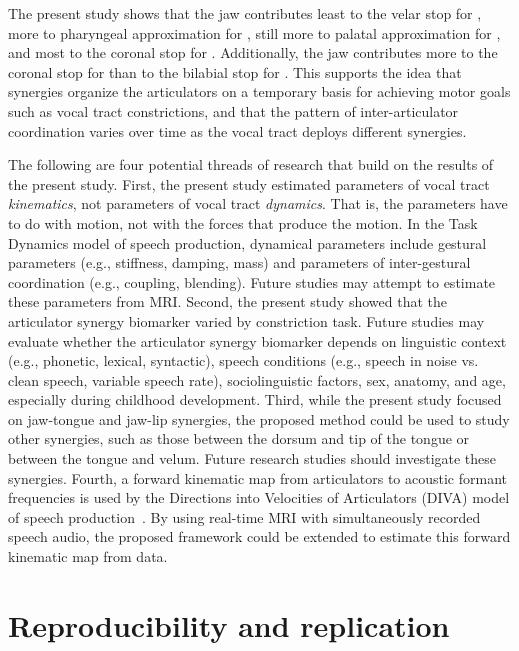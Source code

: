 \documentclass[preprint]{JASAnew}\usepackage[]{graphicx}\usepackage[]{color}
\begin{document}
The present study shows that the jaw contributes 
least to the velar stop for \textipa{[k]},
more to pharyngeal approximation for \textipa{[A]}, 
still more to palatal approximation for \textipa{[i]},
and most to the coronal stop for \textipa{[t]}.
Additionally, the jaw contributes more to the coronal stop for \textipa{[t]} than to the bilabial stop for \textipa{[p]}.
%
This supports the idea that synergies organize the articulators on a temporary basis for achieving motor goals such as vocal tract constrictions, and that the pattern of inter-articulator coordination varies over time as the vocal tract deploys different synergies. 




The following are four potential threads of research that build on the results of the present study.
%
First, the present study estimated parameters of vocal tract \textit{kinematics}, not parameters of vocal tract \textit{dynamics}. That is, the parameters have to do with motion, not with the forces that produce the motion. In the Task Dynamics model of speech production, dynamical parameters include gestural parameters (e.g., stiffness, damping, mass) and parameters of inter-gestural coordination (e.g., coupling, blending). Future studies may attempt to estimate these parameters from MRI.
%
Second, the present study showed that the articulator synergy biomarker varied by constriction task. Future studies may evaluate whether the articulator synergy biomarker depends on linguistic context (e.g., phonetic, lexical, syntactic), speech conditions (e.g., speech in noise vs. clean speech, variable speech rate), sociolinguistic factors, sex, anatomy, and age, especially during childhood development.
%
Third, while the present study focused on jaw-tongue and jaw-lip synergies, the proposed method could be used to study other synergies, such as those between the dorsum and tip of the tongue or between the tongue and velum. Future research studies should investigate these synergies.
%
Fourth, a forward kinematic map from articulators to acoustic formant frequencies is used by the Directions into Velocities of Articulators (DIVA) model of speech production~\cite{guenther1995speech}. By using real-time MRI with simultaneously recorded speech audio, the proposed framework could be extended to estimate this forward kinematic map from data.




\section{Reproducibility and replication}
\end{document}

